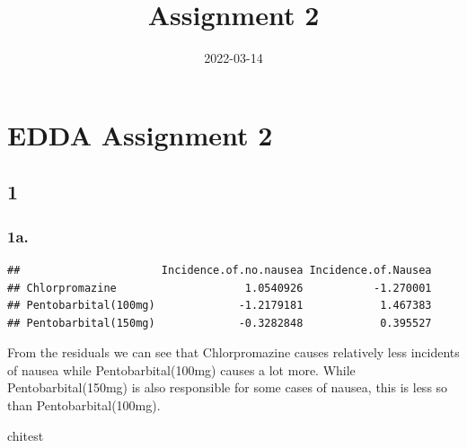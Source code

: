\documentclass[
]{article}
\title{Assignment 2}
\author{}
\date{\vspace{-2.5em}2022-03-14}
\newenvironment{Shaded}{\begin{snugshade}}{\end{snugshade}}
\newcommand{\AttributeTok}[1]{\textcolor[rgb]{0.77,0.63,0.00}{#1}}
\newcommand{\FunctionTok}[1]{\textcolor[rgb]{0.00,0.00,0.00}{#1}}
\newcommand{\NormalTok}[1]{#1}
\newcommand{\OtherTok}[1]{\textcolor[rgb]{0.56,0.35,0.01}{#1}}
\newcommand{\SpecialCharTok}[1]{\textcolor[rgb]{0.00,0.00,0.00}{#1}}
\newcommand{\StringTok}[1]{\textcolor[rgb]{0.31,0.60,0.02}{#1}}
\begin{document}
\maketitle

\hypertarget{edda-assignment-2}{%
\section{EDDA Assignment 2}\label{edda-assignment-2}}

\hypertarget{section}{%
\subsection{1}\label{section}}

\hypertarget{a.}{%
\subsubsection{1a.}\label{a.}}

\begin{Shaded}
\end{Shaded}

\begin{verbatim}
##                      Incidence.of.no.nausea Incidence.of.Nausea
## Chlorpromazine                    1.0540926           -1.270001
## Pentobarbital(100mg)             -1.2179181            1.467383
## Pentobarbital(150mg)             -0.3282848            0.395527
\end{verbatim}

From the residuals we can see that Chlorpromazine causes relatively less
incidents of nausea while Pentobarbital(100mg) causes a lot more. While
Pentobarbital(150mg) is also responsible for some cases of nausea, this
is less so than Pentobarbital(100mg).

\begin{Shaded}
\begin{Highlighting}[]
\NormalTok{chitest}
\end{Highlighting}
\end{Shaded}
\end{document}
